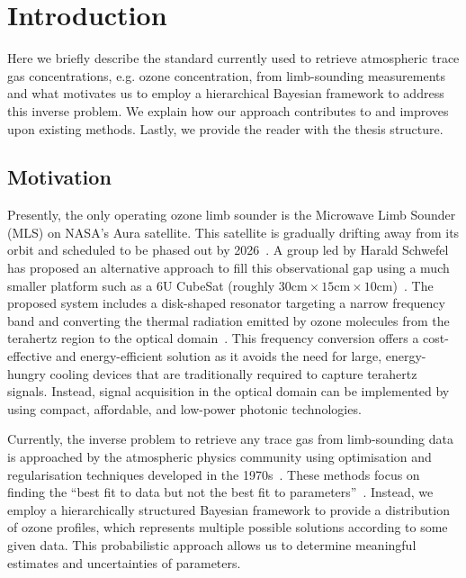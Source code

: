 \chapter{Introduction}

Here we briefly describe the standard currently used to retrieve atmospheric trace gas concentrations, e.g. ozone concentration, from limb-sounding measurements and what motivates us to employ a hierarchical Bayesian framework to address this inverse problem.
We explain how our approach contributes to and improves upon existing methods.
Lastly, we provide the reader with the thesis structure.


\section{Motivation}
Presently, the only operating ozone limb sounder is the Microwave Limb Sounder (MLS) on NASA's Aura satellite.
This satellite is gradually drifting away from its orbit and scheduled to be phased out by 2026~\cite{Bryan2024NASA}.
A group led by Harald Schwefel has proposed an alternative approach to fill this observational gap using a much smaller platform such as a 6U CubeSat (roughly $30\text{cm} \times 15\text{cm} \times 10\text{cm}$)~\cite{ustin2024current}. 
The proposed system includes a disk-shaped resonator targeting a narrow frequency band and converting the thermal radiation emitted by ozone molecules from the terahertz region to the optical domain~\cite{Suresh25,Sedlmeir14}. 
This frequency conversion offers a cost-effective and energy-efficient solution as it avoids the need for large, energy-hungry cooling devices that are traditionally required to capture terahertz signals. 
Instead, signal acquisition in the optical domain can be implemented by using compact, affordable, and low-power photonic technologies.

Currently, the inverse problem to retrieve any trace gas from limb-sounding data is approached by the atmospheric physics community using optimisation and regularisation techniques developed in the 1970s~\cite{rodgers1976retrieval, NASA2022MLSv5}.
These methods focus on finding the ``best fit to data but not the best fit to parameters''~\cite{tan2016LecNot}.
Instead, we employ a hierarchically structured Bayesian framework to provide a distribution of ozone profiles, which represents multiple possible solutions according to some given data.
This probabilistic approach allows us to determine meaningful estimates and uncertainties of parameters.

